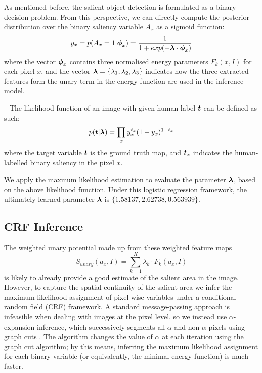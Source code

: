 \documentclass[10pt,twocolumn,letterpaper]{article}
\newcommand{\SUM}{\sum\limits}
\begin{document}
As mentioned before, the salient object detection is formulated as a binary decision problem. From this perspective, we can directly compute the posterior distribution over the binary saliency variable $A_x$ as a sigmoid function:
$$ y_x = p ( A_x = 1 | \boldsymbol{\phi}_x) = \frac{1}{1 + exp(-\boldsymbol{\lambda} \cdot \boldsymbol{\phi}_x)}$$
where the vector $\boldsymbol{\phi}_x$ contains three normalised energy parameters $F_k (x, I)$ for each pixel $x$, and the vector $\boldsymbol{\lambda} = \{ \lambda_1, \lambda_2, \lambda_3\}$ indicates how the three extracted features form the unary term in the energy function are used in the inference model.


+The likelihood function of an image with given human label $\boldsymbol{t}$ can be defined as such:
$$ p( \boldsymbol{t} | \boldsymbol{\lambda}) = \prod_{x} y_{x}^{t_{x}} (1 - y_{x})^{1-t_x} $$
where the target variable $\boldsymbol{t}$ is the ground truth map, and $\boldsymbol{t}_x$ indicates the human-labelled binary saliency in the pixel $x$. 

We apply the maxmum likelihood estimation to evaluate the parameter $\boldsymbol{\lambda}$, based on the above likelihood function. Under this logistic regression framework, the ultimately learned parameter $\boldsymbol{\lambda}$ is $\{ 1.58137, 2.62738, 0.563939 \}$. 
\subsection{CRF Inference}
The weighted unary potential made up from these weighted feature maps $$S_{unary}(a_x,I) = \SUM_{k=1}^K \lambda_k \cdot F_k(a_x,I)$$ is likely to already provide a good estimate of the salient area in the image.  However, to capture the spatial continuity of the salient area we infer the maximum likelihood assignment of pixel-wise variables under a conditional random field (CRF) framework.  A standard message-passing approach is infeasible when dealing with images at the pixel level, so we instead use $\alpha$-expansion inference, which successively segments all $\alpha$ and non-$\alpha$ pixels using graph cuts \cite{graphcut}.  The algorithm changes the value of $\alpha$ at each iteration using the graph cut algorithm; by this means, inferring the maximum likelihood assignment for each binary variable (or equivalently, the minimal energy function) is much faster. 
\end{document}
